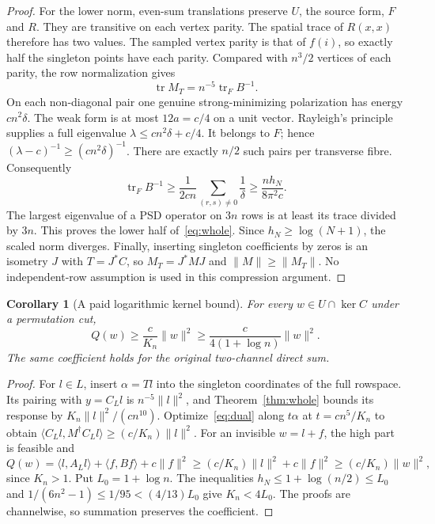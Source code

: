 \documentclass[11pt]{article}
\newcommand{\norm}[1]{\lVert#1\rVert}
\newcommand{\ip}[2]{\langle#1,#2\rangle}
\DeclareMathOperator{\tr}{tr}
\newtheorem{corollary}[theorem]{Corollary}
\theoremstyle{definition}
\theoremstyle{remark}
\begin{document}
\begin{proof}
For the lower norm, even-sum translations preserve $U$, the source form,
$F$ and $R$. They are transitive on each vertex parity. The spatial trace
of $R(x,x)$ therefore has two values. The sampled vertex parity is that
of $f(i)$, so exactly half the singleton points have each parity. Compared
with $n^3/2$ vertices of each parity, the row normalization gives
\begin{equation}\label{eq:tracewhole}
                  \tr M_T=n^{-5}\tr_F B^{-1}.
\end{equation}
On each non-diagonal pair one genuine strong-minimizing polarization has
energy $cn^2\delta$. The weak form is at most $12a=c/4$ on a unit vector.
Rayleigh's principle supplies a full eigenvalue
$\lambda\le cn^2\delta+c/4$. It belongs to $F$; hence
$(\lambda-c)^{-1}\ge(cn^2\delta)^{-1}$. There are exactly $n/2$ such
pairs per transverse fibre. Consequently
\[
 \tr_F B^{-1}\ge\frac1{2cn}\sum_{(r,s)\ne0}\frac1\delta
              \ge\frac{nh_N}{8\pi^2c}.
\]
The largest eigenvalue of a PSD operator on $3n$ rows is at least its
trace divided by $3n$. This proves the lower half of~\eqref{eq:whole}.
Since $h_N\ge\log(N+1)$, the scaled norm diverges. Finally, inserting
singleton coefficients by zeros is an isometry $J$ with $T=J^*C$, so
$M_T=J^*MJ$ and $\norm M\ge\norm{M_T}$. No independent-row assumption
is used in this compression argument.
\end{proof}

\begin{corollary}[A paid logarithmic kernel bound]\label{cor:kernel}
For every $w\in U\cap\ker C$ under a permutation cut,
\begin{equation}\label{eq:kernel}
 Q(w)\ge\frac c{K_n}\norm w^2
             \ge\frac c{4(1+\log n)}\norm w^2.
\end{equation}
The same coefficient holds for the original two-channel direct sum.
\end{corollary}
\begin{proof}
For $l\in L$, insert $\alpha=Tl$ into the singleton coordinates of the full
rowspace. Its pairing with $y=C_Ll$ is $n^{-5}\norm l^2$, and
Theorem~\ref{thm:whole} bounds its response by
$K_n\norm l^2/(cn^{10})$. Optimize~\eqref{eq:dual} along $t\alpha$ at
$t=cn^5/K_n$ to obtain
$\ip{C_Ll}{M^\dagger C_Ll}\ge(c/K_n)\norm l^2$.
For an invisible $w=l+f$, the high part is feasible and
\[
 Q(w)=\ip l{A_Ll}+\ip f{Bf}+c\norm f^2
       \ge(c/K_n)\norm l^2+c\norm f^2
       \ge(c/K_n)\norm w^2,
\]
since $K_n>1$. Put $L_0=1+\log n$. The inequalities
$h_N\le1+\log(n/2)\le L_0$ and
$1/(6n^2-1)\le1/95<(4/13)L_0$ give $K_n<4L_0$.
The proofs are channelwise, so summation preserves the coefficient.
\end{proof}
\end{document}
